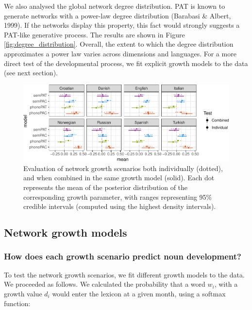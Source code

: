 \documentclass[10pt, letterpaper]{article}
\newenvironment{CodeChunk}{}{}
\begin{document}
We also analysed the global network degree distribution. PAT is known to
generate networks with a power-law degree distribution (Barabasi \&
Albert, 1999). If the networks display this property, this fact would
strongly suggests a PAT-like generative process. The results are shown
in Figure \ref{fig:degree_distribution}. Overall, the extent to which
the degree distribution approximates a power law varies across
dimensions and languages. For a more direct test of the developmental
process, we fit explicit growth models to the data (see next section).

\begin{CodeChunk}
\begin{figure}[h]

{\centering \includegraphics{figs/pred_ind_img-1} 

}

\caption{\label{fig:pred_ind}Evaluation of network growth scenarios both individually (dotted), and when combined in the same growth model (solid). Each dot represents the mean of the posterior distribution of the corresponding growth parameter, with ranges representing 95\% credible intervals (computed using the highest density intervals).}\label{fig:pred_ind_img}
\end{figure}
\end{CodeChunk}

\subsection{Network growth models}\label{network-growth-models}

\subsubsection{How does each growth scenario predict noun
development?}\label{how-does-each-growth-scenario-predict-noun-development}

To test the network growth scenarios, we fit different growth models to
the data. We proceeded as follows. We calculated the probability that a
word \(w_i\), with a growth value \(d_i\) would enter the lexicon at a
given month, using a softmax function:
\end{document}
